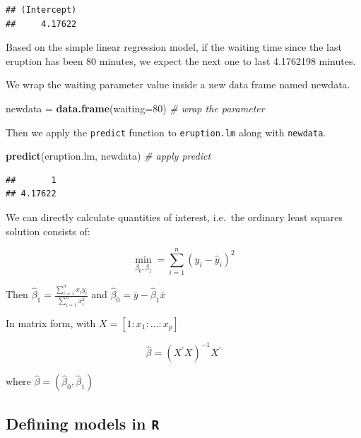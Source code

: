 \documentclass[]{article}
\newenvironment{Shaded}{\begin{snugshade}}{\end{snugshade}}
\newcommand{\KeywordTok}[1]{\textcolor[rgb]{0.13,0.29,0.53}{\textbf{{#1}}}}
\newcommand{\DataTypeTok}[1]{\textcolor[rgb]{0.13,0.29,0.53}{{#1}}}
\newcommand{\DecValTok}[1]{\textcolor[rgb]{0.00,0.00,0.81}{{#1}}}
\newcommand{\StringTok}[1]{\textcolor[rgb]{0.31,0.60,0.02}{{#1}}}
\newcommand{\CommentTok}[1]{\textcolor[rgb]{0.56,0.35,0.01}{\textit{{#1}}}}
\newcommand{\NormalTok}[1]{{#1}}
\numberwithin{equation}{section}
\begin{document}
\begin{verbatim}
## (Intercept) 
##     4.17622
\end{verbatim}

Based on the simple linear regression model, if the waiting time since
the last eruption has been 80 minutes, we expect the next one to last
4.1762198 minutes.

We wrap the waiting parameter value inside a new data frame named
newdata.

\begin{Shaded}
\begin{Highlighting}[]
\NormalTok{newdata =}\StringTok{ }\KeywordTok{data.frame}\NormalTok{(}\DataTypeTok{waiting=}\DecValTok{80}\NormalTok{) }\CommentTok{# wrap the parameter }
\end{Highlighting}
\end{Shaded}

Then we apply the \texttt{predict} function to \texttt{eruption.lm}
along with \texttt{newdata}.

\begin{Shaded}
\begin{Highlighting}[]
\KeywordTok{predict}\NormalTok{(eruption.lm, newdata)    }\CommentTok{# apply predict }
\end{Highlighting}
\end{Shaded}

\begin{verbatim}
##       1 
## 4.17622
\end{verbatim}

We can directly calculate quantities of interest, i.e.~the ordinary
least squares solution consists of:

\[
\min_{\beta_0,\beta_1} = \sum_{i=1}^{n} (y_i - \hat{y}_i)^2  
\]

Then \(\hat{\beta}_1 = \frac{\sum_{i=1}^{n}x_iy_i}{\sum_{i=1}^n x_i^2}\)
and \(\hat{\beta}_0 = \bar{y} - \hat{\beta}_1\bar{x}\)

In matrix form, with \(X=[1:x_1:...:x_p]\)

\[
\hat{\beta}  = (X^\prime X)^{-1} X^\prime
\]

where \(\hat{\beta} = (\hat{\beta}_0,\hat{\beta}_1)\)

\subsection{\texorpdfstring{Defining models in
\texttt{R}}{Defining models in R}}\label{defining-models-in-r}
\end{document}
